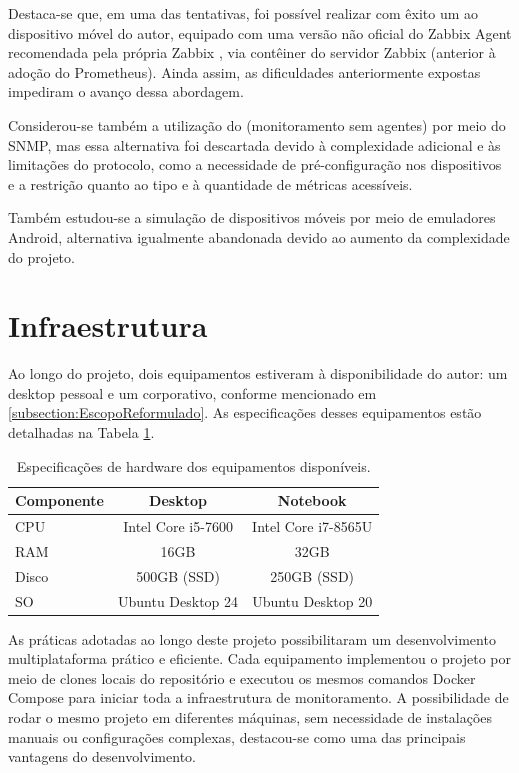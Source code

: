 Destaca-se que, em uma das tentativas, foi possível realizar com êxito um  ao dispositivo móvel do autor, equipado com uma versão não oficial do Zabbix Agent recomendada pela própria Zabbix \citep{unofficialzabbixagent2025}, via contêiner do servidor Zabbix (anterior à adoção do Prometheus). Ainda assim, as dificuldades anteriormente expostas impediram o avanço dessa abordagem.

Considerou-se também a utilização do  (monitoramento sem agentes) por meio do SNMP, mas essa alternativa foi descartada devido à complexidade adicional e às limitações do protocolo, como a necessidade de pré-configuração nos dispositivos e a restrição quanto ao tipo e à quantidade de métricas acessíveis.

Também estudou-se a simulação de dispositivos móveis por meio de emuladores Android, alternativa igualmente abandonada devido ao aumento da complexidade do projeto.


\section{Infraestrutura}
\label{section:Infraestrutura}

Ao longo do projeto, dois equipamentos estiveram à disponibilidade do autor: um desktop pessoal e um  corporativo, conforme mencionado em \ref{subsection:EscopoReformulado}. As especificações desses equipamentos estão detalhadas na Tabela \ref{tab:available-hardware}.

\begin{table}[H]
\centering
\caption{Especificações de hardware dos equipamentos disponíveis.}
\label{tab:available-hardware}
\begin{tabular}{lcc}
\toprule
\textbf{Componente} & \textbf{Desktop} & \textbf{Notebook} \\
\midrule
CPU   & Intel Core i5-7600   & Intel Core i7-8565U \\
RAM   & 16GB                 & 32GB                \\
Disco & 500GB (SSD)            & 250GB (SSD)          \\
SO & Ubuntu Desktop 24 & Ubuntu Desktop 20 \\
\bottomrule
\end{tabular}
\end{table}

As práticas adotadas ao longo deste projeto possibilitaram um desenvolvimento multiplataforma prático e eficiente. Cada equipamento implementou o projeto por meio de clones locais do repositório e executou os mesmos comandos Docker Compose para iniciar toda a infraestrutura de monitoramento. A possibilidade de rodar o mesmo projeto em diferentes máquinas, sem necessidade de instalações manuais ou configurações complexas, destacou-se como uma das principais vantagens do desenvolvimento.

